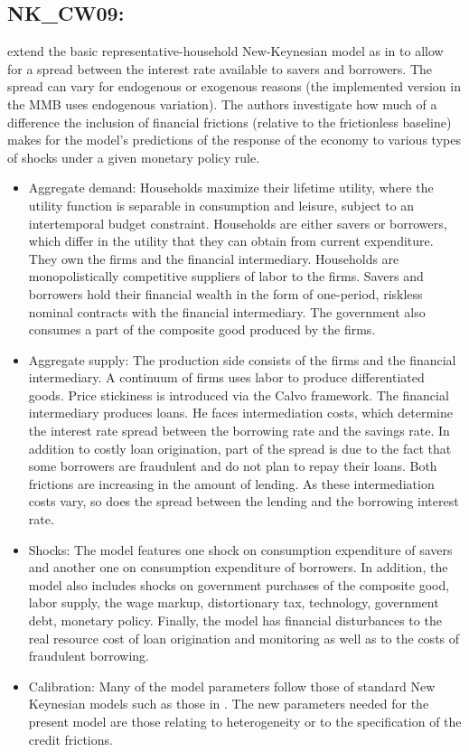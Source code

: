 \documentclass[11pt,a4paper]{article}
\begin{document}
	\subsection{NK\_CW09: \texorpdfstring{\cite{CurdiaWoodford2009}}{Crudia and Woodford (2009)}}
	\label{NKCW09}
	\cite{CurdiaWoodford2009} extend the basic representative-household New-Keynesian model as in \cite{Woodford2003} to allow for a spread between the interest rate available to savers and borrowers. The spread can vary for endogenous or exogenous reasons (the implemented version in the MMB uses endogenous variation). The authors investigate how much of a difference the inclusion of financial frictions (relative to the frictionless baseline) makes for the model's predictions of the response of the economy to various types of shocks under a given monetary policy rule.
	\begin{itemize}
		\item Aggregate demand: Households maximize their lifetime utility, where the utility function is separable in consumption and leisure, subject to an intertemporal budget constraint. Households are either savers or borrowers, which differ in the utility that they can obtain from current expenditure. They own the firms and the financial intermediary. Households are monopolistically competitive suppliers of labor to the firms. Savers and borrowers hold their financial wealth in the form of one-period, riskless nominal contracts with the financial intermediary. The government also consumes a part of the composite good produced by the firms.
		\item Aggregate supply: The production side consists of the firms and the financial intermediary. A continuum of firms uses labor to produce differentiated goods. Price stickiness is introduced via the Calvo framework. The financial intermediary produces loans. He faces intermediation costs, which determine the interest rate spread between the borrowing rate and the savings rate. In addition to costly loan origination, part of the spread is due to the fact that some borrowers are fraudulent and do not plan to repay their loans. Both frictions are increasing in the amount of lending. As these intermediation costs vary, so does the spread between the lending and the borrowing interest rate.
		\item Shocks: The model features one shock on consumption expenditure of savers and another one on consumption expenditure of borrowers. In addition, the model also includes shocks on government purchases of the composite good, labor supply, the wage markup, distortionary tax, technology, government debt, monetary policy. Finally, the model has financial disturbances to the real resource cost of loan origination and monitoring as well as to the costs of fraudulent borrowing.   
		\item Calibration: Many of the model parameters follow those of standard  New Keynesian models such as those in \cite{Woodford2003}. The new parameters needed for the present model are those relating to heterogeneity or to the specification of the credit frictions.
	\end{itemize}
	
\end{document}
